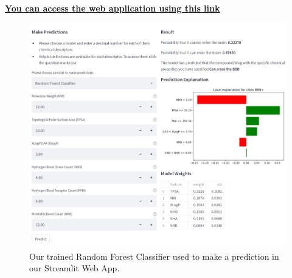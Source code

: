 \href{https://share.streamlit.io/georgeiniatis/blood_brain_barrier_drug_prediction/main/Streamlit_App/app.py}{\textbf{You can access the web application using this link}}

\begin{figure}[htb]
    \centering
    \includegraphics[width=0.8\linewidth]{images/Streamlit.pdf}    
    \caption{Our trained Random Forest Classifier used to make a prediction in our Streamlit Web App.}

    \label{fig:Streamlit} 
\end{figure}


 


